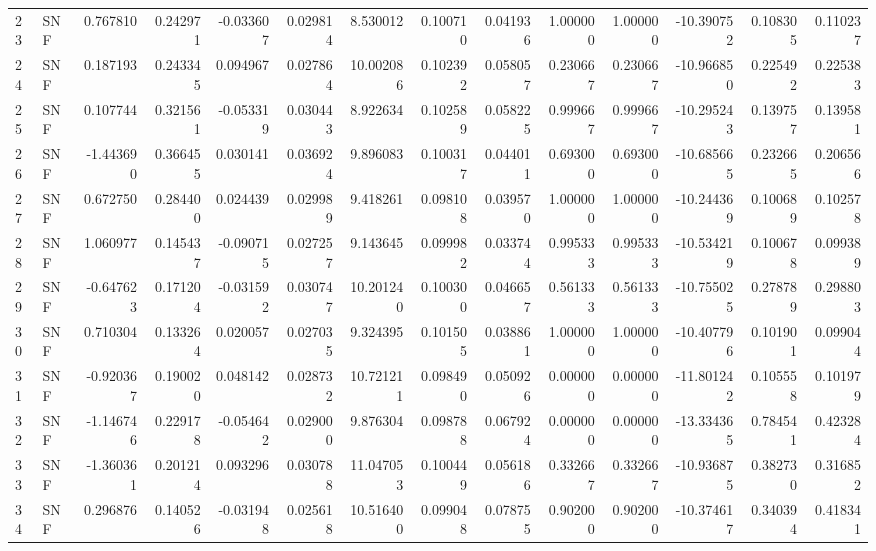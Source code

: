\begin{tabular}{llrrrrrrrrrrrr}
23  &    SNF &  0.767810 &      0.242971 & -0.033607 &    0.029814 &   8.530012 &      0.100710 &   0.041936 &  1.000000 &  1.000000 & -10.390752 &     0.108305 &     0.110237 \\
24  &    SNF &  0.187193 &      0.243345 &  0.094967 &    0.027864 &  10.002086 &      0.102392 &   0.058057 &  0.230667 &  0.230667 & -10.966850 &     0.225492 &     0.225383 \\
25  &    SNF &  0.107744 &      0.321561 & -0.053319 &    0.030443 &   8.922634 &      0.102589 &   0.058225 &  0.999667 &  0.999667 & -10.295243 &     0.139757 &     0.139581 \\
26  &    SNF & -1.443690 &      0.366455 &  0.030141 &    0.036924 &   9.896083 &      0.100317 &   0.044011 &  0.693000 &  0.693000 & -10.685665 &     0.232665 &     0.206566 \\
27  &    SNF &  0.672750 &      0.284400 &  0.024439 &    0.029989 &   9.418261 &      0.098108 &   0.039570 &  1.000000 &  1.000000 & -10.244369 &     0.100689 &     0.102578 \\
28  &    SNF &  1.060977 &      0.145437 & -0.090715 &    0.027257 &   9.143645 &      0.099982 &   0.033744 &  0.995333 &  0.995333 & -10.534219 &     0.100678 &     0.099389 \\
29  &    SNF & -0.647623 &      0.171204 & -0.031592 &    0.030747 &  10.201240 &      0.100300 &   0.046657 &  0.561333 &  0.561333 & -10.755025 &     0.278789 &     0.298803 \\
30  &    SNF &  0.710304 &      0.133264 &  0.020057 &    0.027035 &   9.324395 &      0.101505 &   0.038861 &  1.000000 &  1.000000 & -10.407796 &     0.101901 &     0.099044 \\
31  &    SNF & -0.920367 &      0.190020 &  0.048142 &    0.028732 &  10.721211 &      0.098490 &   0.050926 &  0.000000 &  0.000000 & -11.801242 &     0.105558 &     0.101979 \\
32  &    SNF & -1.146746 &      0.229178 & -0.054642 &    0.029000 &   9.876304 &      0.098788 &   0.067924 &  0.000000 &  0.000000 & -13.334365 &     0.784541 &     0.423284 \\
33  &    SNF & -1.360361 &      0.201214 &  0.093296 &    0.030788 &  11.047053 &      0.100449 &   0.056186 &  0.332667 &  0.332667 & -10.936875 &     0.382730 &     0.316852 \\
34  &    SNF &  0.296876 &      0.140526 & -0.031948 &    0.025618 &  10.516400 &      0.099048 &   0.078755 &  0.902000 &  0.902000 & -10.374617 &     0.340394 &     0.418341 \\

\end{tabular}
